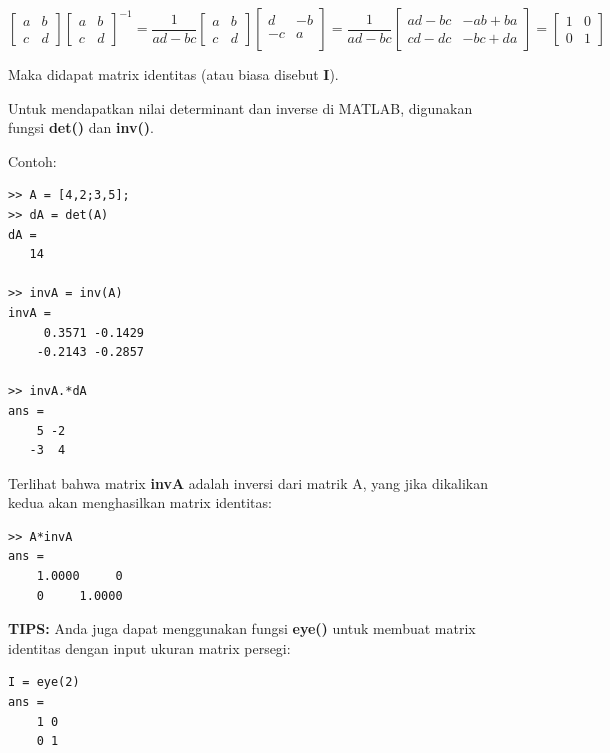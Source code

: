 \documentclass[12pt]{book}
\begin{document}
	\[
	\begin{bmatrix}
		a & b\\
		c & d
	\end{bmatrix}
	\begin{bmatrix}
		a & b\\
		c & d
	\end{bmatrix}^{-1}
	=
	\frac{1}{ad-bc}
	\begin{bmatrix}
		a & b\\
		c & d
	\end{bmatrix}
	\begin{bmatrix}
		d & -b \\
		-c & a\\
	\end{bmatrix}
	=
	\frac{1}{ad-bc}
	\begin{bmatrix}
		ad-bc & -ab+ba\\
		cd-dc & -bc+da
	\end{bmatrix}
	=
	\begin{bmatrix}
		1 & 0\\
		0 & 1
	\end{bmatrix}
	\]

	Maka didapat matrix identitas (atau biasa disebut \textbf{I}).

	Untuk mendapatkan nilai determinant dan inverse di MATLAB, digunakan fungsi \textbf{det()} dan \textbf{inv()}.

	Contoh:
	\begin{verbatim}
>> A = [4,2;3,5];
>> dA = det(A)
dA =
   14

>> invA = inv(A)
invA =
     0.3571 -0.1429
    -0.2143 -0.2857

>> invA.*dA
ans =
    5 -2
   -3  4
	\end{verbatim}

	Terlihat bahwa matrix \textbf{invA} adalah inversi dari matrik A, yang jika dikalikan kedua akan menghasilkan matrix identitas:
	\begin{verbatim}
>> A*invA
ans =
    1.0000     0
    0     1.0000
	\end{verbatim}

	\textbf{TIPS:} Anda juga dapat menggunakan fungsi \textbf{eye()} untuk membuat matrix identitas dengan input ukuran matrix persegi:
	 \begin{verbatim}
I = eye(2)
ans =
    1 0
    0 1
	 \end{verbatim}
\end{document}
